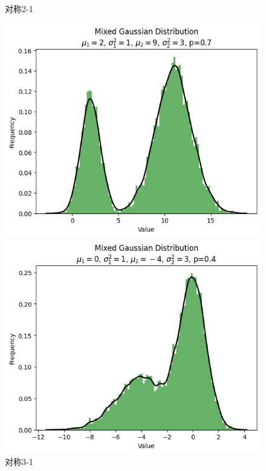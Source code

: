 \documentclass{article}
\begin{document}
\begin{figure}[H]
\begin{minipage}[b]{0.3\linewidth}
        \caption{对称2-1}
    \end{minipage}
    \hfill
    \begin{minipage}[b]{0.3\linewidth}
        \centering
        \includegraphics[width=\linewidth]{figure/对称5.png}
        \caption{对称3-1}
    \end{minipage}
    \hfill
    \vspace{4mm} %
    \begin{minipage}[b]{0.3\linewidth}
        \centering
        \includegraphics[width=\linewidth]{figure/对称2.png}

\end{minipage}
\end{figure}
\end{document}
